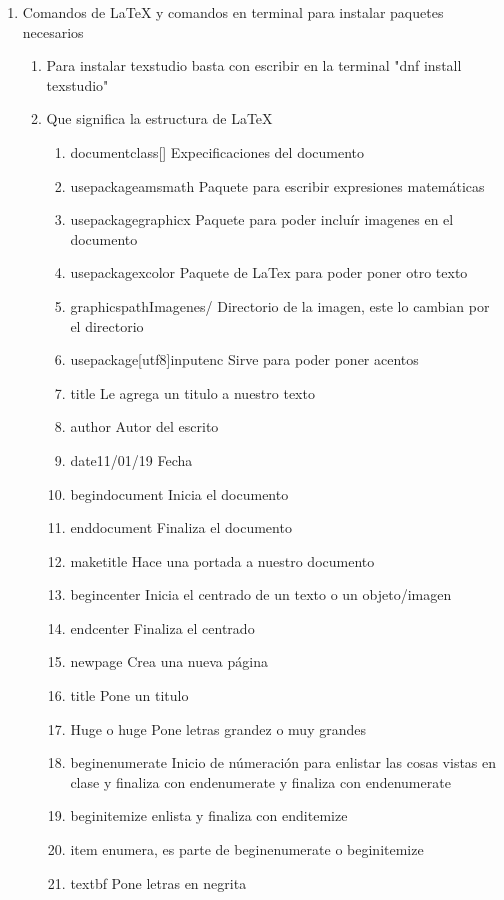 \documentclass[letterpaper, 12pt, oneside]{article}%
\begin{document}
\begin{enumerate}
\begin{itemize}
				
	\end{itemize}%
	\item Comandos de LaTeX y comandos en terminal para instalar paquetes necesarios
		\begin{enumerate}
			\item Para instalar texstudio basta con escribir en la terminal "dnf install texstudio"
			\item Que significa la estructura de LaTeX
			\begin{enumerate}
				\item documentclass[]{} Expecificaciones del documento
				\item usepackage{amsmath} Paquete para escribir expresiones matemáticas
				\item usepackage{graphicx} Paquete para poder incluír imagenes en el documento
				\item usepackage{xcolor} Paquete de LaTex para poder poner otro texto
				\item graphicspath{{Imagenes/}} Directorio de la imagen, este lo cambian por el directorio
				\item usepackage[utf8]{inputenc} Sirve para poder poner acentos
				\item title{} Le agrega un titulo a nuestro texto
				\item author{} Autor del escrito
				\item date{11/01/19} Fecha
				\item begin{document} Inicia el documento
				\item end{document} Finaliza el documento
				\item maketitle Hace una portada a nuestro documento
				\item begin{center} Inicia el centrado de un texto o un objeto/imagen
				\item end{center} Finaliza el centrado
				\item newpage Crea una nueva página
				\item title{} Pone un titulo
				\item Huge o huge Pone letras grandez o muy grandes
				\item begin{enumerate} Inicio de númeración para enlistar las cosas vistas en clase y finaliza con end{enumerate} y finaliza con end{enumerate}
				\item begin{itemize} enlista y finaliza con end{itemize}
				\item item enumera, es parte de begin{enumerate} o begin{itemize}
				\item textbf Pone letras en negrita
				

\end{enumerate}
\end{enumerate}
\end{enumerate}
\end{document}
